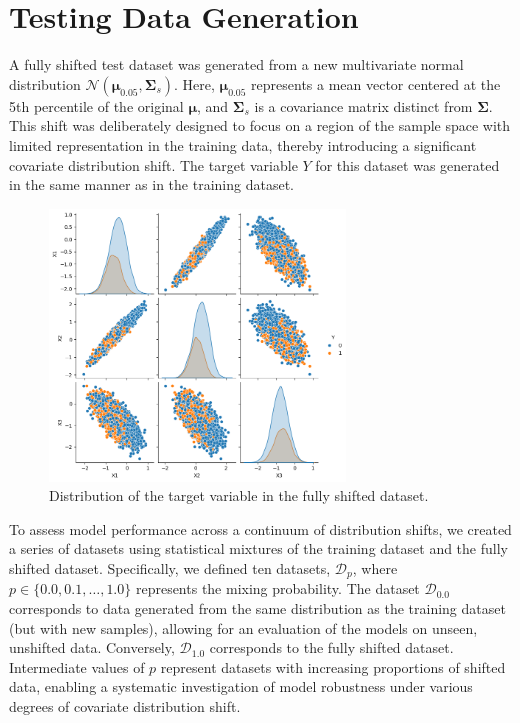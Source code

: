 \section{Testing Data Generation}
A fully shifted test dataset was generated from a new multivariate normal distribution $\mathcal{N}(\boldsymbol{\mu}_{0.05}, \boldsymbol{\Sigma}_s)$. Here, $\boldsymbol{\mu}_{0.05}$ represents a mean vector centered at the 5th percentile of the original $\boldsymbol{\mu}$, and $\boldsymbol{\Sigma}_s$ is a covariance matrix distinct from $\boldsymbol{\Sigma}$. This shift was deliberately designed to focus on a region of the sample space with limited representation in the training data, thereby introducing a significant covariate distribution shift. The target variable $Y$ for this dataset was generated in the same manner as in the training dataset.

\begin{figure}
    \centering
    \includegraphics[width=0.7\textwidth]{assets/label_dist_fullyshift.png}
    \caption{Distribution of the target variable in the fully shifted dataset.}
    \label{fig:label_dist_fullyshift}
\end{figure}

To assess model performance across a continuum of distribution shifts, we created a series of datasets using statistical mixtures of the training dataset and the fully shifted dataset. Specifically, we defined ten datasets, $\mathcal{D}_p$, where $p \in \{0.0, 0.1, \ldots, 1.0\}$ represents the mixing probability. The dataset $\mathcal{D}_{0.0}$ corresponds to data generated from the same distribution as the training dataset (but with new samples), allowing for an evaluation of the models on unseen, unshifted data. Conversely, $\mathcal{D}_{1.0}$ corresponds to the fully shifted dataset. Intermediate values of $p$ represent datasets with increasing proportions of shifted data, enabling a systematic investigation of model robustness under various degrees of covariate distribution shift.

